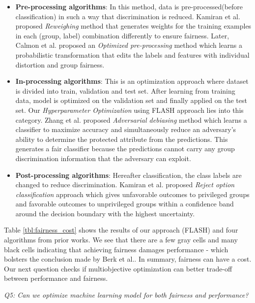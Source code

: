 \documentclass{NSF}
\newenvironment{myitemize}
{ \begin{itemize}
    \setlength{\itemsep}{0pt}
    \setlength{\parskip}{0pt}
    \setlength{\parsep}{0pt}     }
{ \end{itemize}                  }
\newcommand{\bi}{\begin{myitemize}}
\newcommand{\ei}{\end{myitemize}}
\begin{document}
\begin{nsfdescription}
\bi
\item \textbf{Pre-processing algorithms}: In this method, data is pre-processed(before classification) in such a way that discrimination is reduced. Kamiran et al. proposed \textit{Reweighing} \cite{Kamiran2012} method that generates weights for the training examples in each (group, label) combination differently to ensure fairness. Later, Calmon et al. proposed an \textit{Optimized pre-processing} method \cite{NIPS2017_6988} which learns a probabilistic transformation that edits the labels and features with individual distortion and group fairness.


\item \textbf{In-processing algorithms}: This is an optimization approach where dataset is divided into train, validation and test set. After learning from training data, model is optimized on the validation set and finally applied on the test set. Our \textit{Hyperparameter Optimization} using FLASH approach lies into this category. Zhang et al. proposed \textit{Adversarial debiasing}  \cite{Zhang:2018:MUB:3278721.3278779} method which learns a classifier to maximize accuracy and simultaneously reduce an adversary's ability to determine the protected attribute from the predictions. This generates a fair classifier because the predictions cannot carry any group discrimination information that the adversary can exploit.


\item \textbf{Post-processing algorithms}: Hereafter classification, the class labels are changed to reduce discrimination. Kamiran et al. proposed \textit{Reject option classification} approach \cite{Kamiran:2018:ERO:3165328.3165686} which gives unfavorable outcomes to privileged groups and favorable outcomes to unprivileged groups within a confidence band around the decision boundary with the highest uncertainty.

\ei

Table \ref{tbl:fairness_cost} shows the results of our approach (FLASH) and four algorithms from prior works. We see that there are a few gray cells and many black cells indicating that achieving fairness damages performance - which bolsters the conclusion made by Berk et al.\cite{berk2017convex}. In summary,  fairness can have a cost. Our next question checks if multiobjective optimization can better trade-off between performance and fairness.  

{\em Q5: Can we optimize machine learning model for both fairness and performance?}


\end{nsfdescription}
\end{document}

